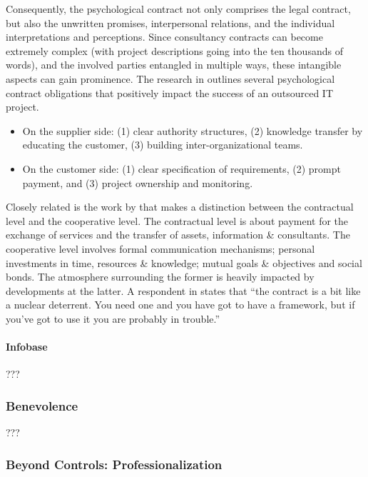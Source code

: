 \documentclass[12pt]{article}
\providecommand{\tightlist}{%
  \setlength{\itemsep}{0pt}\setlength{\parskip}{0pt}}
\begin{document}
Consequently, the psychological contract not only comprises the legal
contract, but also the unwritten promises, interpersonal relations, and
the individual interpretations and perceptions. Since consultancy
contracts can become extremely complex (with project descriptions going
into the ten thousands of words), and the involved parties entangled in
multiple ways, these intangible aspects can gain prominence. The
research in \citet[369-70]{ang2004} outlines several psychological
contract obligations that positively impact the success of an outsourced
IT project.

\begin{itemize}
\tightlist
\item
  On the supplier side: (1) clear authority structures, (2) knowledge
  transfer by educating the customer, (3) building inter-organizational
  teams.
\item
  On the customer side: (1) clear specification of requirements, (2)
  prompt payment, and (3) project ownership and monitoring.
\end{itemize}

Closely related is the work by \citet[9-13]{willcockskern} that makes a
distinction between the contractual level and the cooperative level. The
contractual level is about payment for the exchange of services and the
transfer of assets, information \& consultants. The cooperative level
involves formal communication mechanisms; personal investments in time,
resources \& knowledge; mutual goals \& objectives and social bonds. The
atmosphere surrounding the former is heavily impacted by developments at
the latter. A respondent in \citet[9]{willcockskern} states that ``the
contract is a bit like a nuclear deterrent. You need one and you have
got to have a framework, but if you've got to use it you are probably in
trouble.''

\hypertarget{infobase}{%
\paragraph{Infobase}\label{infobase}}

???

\hypertarget{benevolence}{%
\subsubsection{Benevolence}\label{benevolence}}

???

\hypertarget{beyond-controls-professionalization}{%
\subsubsection{Beyond Controls:
Professionalization}\label{beyond-controls-professionalization}}
\end{document}
